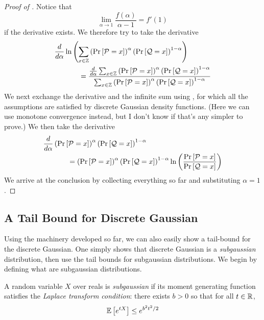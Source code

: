 \documentclass{article}
\begin{document}
\begin{proof}[Proof of ]
	Notice that
	\begin{equation}
		\lim_{\alpha\rightarrow 1}\frac{f(\alpha)}{\alpha-1}=f'(1)
	\end{equation}
	if the derivative exists.
	We therefore try to take the derivative
	\begin{align*}
		\frac{d}{d\alpha}
		&\ln\left(\sum_{x\in\mathbb{Z}}
		\left(\Pr\left[\mathcal{P}=x\right]\right)^\alpha
		\left(\Pr\left[\mathcal{Q}=x\right]\right)^{1-\alpha}\right) \\
		&\qquad=
		\frac{
			\frac{d}{d\alpha}
			\sum_{x\in\mathbb{Z}}
			\left(\Pr\left[\mathcal{P}=x\right]\right)^\alpha
			\left(\Pr\left[\mathcal{Q}=x\right]\right)^{1-\alpha}
		}{
			\sum_{x\in\mathbb{Z}}
			\left(\Pr\left[\mathcal{P}=x\right]\right)^\alpha
			\left(\Pr\left[\mathcal{Q}=x\right]\right)^{1-\alpha}
		}
	\end{align*}
	We next exchange the derivative and the infinite sum using ,
	for which all the assumptions are satisfied by discrete Gaussian density functions.
	(Here we can use monotone convergence instead, but I don't know if that's any simpler to prove.)
	We then take the derivative
	\begin{align*}
		\frac{d}{d\alpha}&
		\left(\Pr\left[\mathcal{P}=x\right]\right)^\alpha
		\left(\Pr\left[\mathcal{Q}=x\right]\right)^{1-\alpha} \\
		&\qquad=\left(\Pr\left[\mathcal{P}=x\right]\right)^\alpha
		\left(\Pr\left[\mathcal{Q}=x\right]\right)^{1-\alpha}
		\ln\left(\frac{\Pr\left[\mathcal{P}=x\right]}{\Pr\left[\mathcal{Q}=x\right]}\right)
	\end{align*}
	We arrive at the conclusion by collecting everything so far and substituting $\alpha=1$.
\end{proof}

\subsection{A Tail Bound for Discrete Gaussian}

Using the machinery developed so far,
we can also easily show a tail-bound for the discrete Gaussian.
One simply shows that discrete Gaussian is a \emph{subgaussian} distribution,
then use the tail bounds for subgaussian distributions.
We begin by defining what are subgaussian distributions.
\begin{definition}
	A random variable $X$ over reals is \emph{subgaussian} if its moment generating function satisfies the \emph{Laplace transform condition}:
	there exists $b>0$ so that for all $t\in\mathbb{R}$,
	\begin{equation}
		\operatorname*{\mathbb{E}}\left[e^{tX}\right] \leq e^{b^2t^2/2}
	\end{equation}
\end{definition}
\end{document}
